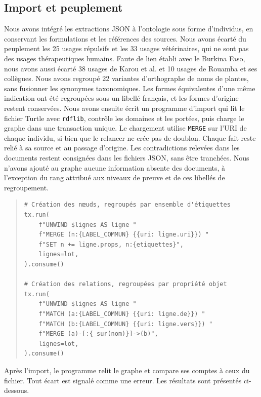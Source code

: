 \subsection{Import et peuplement}
\label{subsec:import_peuplement}

Nous avons intégré les extractions JSON à l'ontologie sous forme d'individus, en conservant les formulations et les références des sources. Nous avons écarté du peuplement les 25 usages répulsifs et les 33 usages vétérinaires, qui ne sont pas des usages thérapeutiques humains. Faute de lien établi avec le Burkina Faso, nous avons aussi écarté 38 usages de Karou et al. et 10 usages de Rouamba et ses collègues. Nous avons regroupé 22 variantes d'orthographe de noms de plantes, sans fusionner les synonymes taxonomiques. Les formes équivalentes d'une même indication ont été regroupées sous un libellé français, et les formes d'origine restent conservées. Nous avons ensuite écrit un programme d'import qui lit le fichier Turtle avec \texttt{rdflib}, contrôle les domaines et les portées, puis charge le graphe dans une transaction unique. Le chargement utilise \texttt{MERGE} sur l'URI de chaque individu, si bien que le relancer ne crée pas de doublon. Chaque fait reste relié à sa source et au passage d'origine. Les contradictions relevées dans les documents restent consignées dans les fichiers JSON, sans être tranchées. Nous n'avons ajouté au graphe aucune information absente des documents, à l'exception du rang attribué aux niveaux de preuve et de ces libellés de regroupement.

\begin{quote}
\begin{verbatim}
# Création des nœuds, regroupés par ensemble d'étiquettes
tx.run(
    f"UNWIND $lignes AS ligne "
    f"MERGE (n:{LABEL_COMMUN} {{uri: ligne.uri}}) "
    f"SET n += ligne.props, n:{etiquettes}",
    lignes=lot,
).consume()

# Création des relations, regroupées par propriété objet
tx.run(
    f"UNWIND $lignes AS ligne "
    f"MATCH (a:{LABEL_COMMUN} {{uri: ligne.de}}) "
    f"MATCH (b:{LABEL_COMMUN} {{uri: ligne.vers}}) "
    f"MERGE (a)-[:{_sur(nom)}]->(b)",
    lignes=lot,
).consume()
\end{verbatim}
\end{quote}

Après l'import, le programme relit le graphe et compare ses comptes à ceux du fichier. Tout écart est signalé comme une erreur. Les résultats sont présentés ci-dessous.

